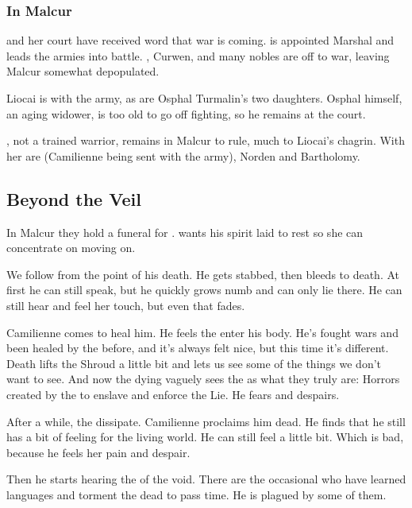 \begin{garbage}
\subsubsection{In Malcur}
\Tiroco{} and her court have received word that war is coming. 
 is appointed Marshal and leads the armies into battle. 
\Cornel, Curwen, \Dornaer{} and many nobles are off to war, leaving Malcur somewhat depopulated. 

Liocai is with the army, as are Osphal Turmalin's two daughters. 
Osphal himself, an aging widower, is too old to go off fighting, so he remains at the court. 

\Tiroco{}, not a trained warrior, remains in Malcur to rule, much to Liocai's chagrin. 
With her are \Vincerre{} (Camilienne being sent with the army), Norden and Bartholomy. 









\subsection{Beyond the Veil}
In Malcur they hold a funeral for \Icor. \Tiroco{} wants his spirit laid to rest so she can concentrate on moving on. 

We follow \Icor{} from the point of his death. He gets stabbed, then bleeds to death. At first he can still speak, but he quickly grows numb and can only lie there. He can still hear \Tiroco{} and feel her touch, but even that fades. 

Camilienne comes to heal him. He feels the \Sephiroth{} enter his body. He's fought wars and been healed by the \Sephiroth{} before, and it's always felt nice, but this time it's different. Death lifts the Shroud a little bit and lets us see some of the things we don't want to see. And now the dying \Icor{} vaguely sees the \Sephiroth{} as what they truly are: Horrors created by the \banes{} to enslave \humanity{} and enforce the Lie. He fears and despairs. 

After a while, the \Sephiroth{} dissipate. Camilienne proclaims him dead. He finds that he still has a bit of feeling for the living world. He can still feel \Tiroco{} a little bit. Which is bad, because he feels her pain and despair. 

Then he starts hearing the \daemons{} of the void. There are the occasional \daemons{} who have learned \Miithian{} languages and torment the dead to pass time. He is plagued by some of them. 


\end{garbage}
